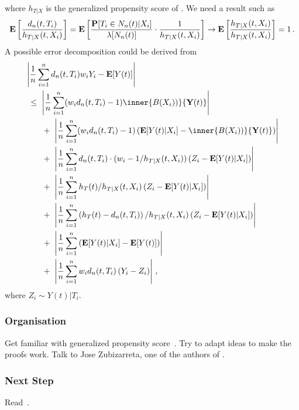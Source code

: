 where 
$
        h_{T|X}
        $ is the generalized propensity score of \cite{Hirano2005}. 
        We need a result such as
  \begin{align*}
    \mathbf{E}
    \left[ 
      \frac{
        d_n(t,T_i)
      }{
        h_{T|X}(t,X_i)
      }
    \right]
    =
    \mathbf{E}
    \left[ 
      \frac{
        \mathbf{P}
        [ T_i \in N_n(t) | X_i]
      }
      {
        \mathbf{\lambda}[N_n(t)]
      }
      \cdot
      \frac{1}
      {
        h_{T|X}(t,X_i)
      }
    \right]
    \to
    \mathbf{E}
    \left[ 
      \frac
      {
        h_{T|X}(t,X_i)
      }
      {
        h_{T|X}(t,X_i)
      }
    \right]
    =1
    \,.
  \end{align*}
  A possible error decomposition could be derived from
\begin{align*}
  &\left| 
  \frac{1}{n}
  \sum_{i=1}^{n} 
  d_n(t,T_i)
  w_i
  Y_i
  -
  \E[Y(t)]
  \right|
  \\
  &
  \ 
  \le
  \ 
  \left|  
  \frac{1}{n}
    \sum_{i=1}^{n} 
    (
    w_i 
  d_n(t,T_i)
    -
    1
    )
    \inner
    {B(X_i))}
    { \mathbf{Y}(t) }
  \right|
  \\
  &
  \qquad
  +
  \ 
  \left|  
  \frac{1}{n}
    \sum_{i=1}^{n} 
    (
    w_i 
  d_n(t,T_i)
    -
    1
    )
    \left( 
    \E[Y(t)| X_i]
    -
    \inner
    {B(X_i))}
    { \mathbf{Y}(t) }
    \right)
  \right|
  \\
  &
  \qquad
  +
  \ 
  \left|  
  \frac{1}{n}
    \sum_{i=1}^{n} 
  d_n(t,T_i)
    \cdot
    (
    w_i 
    -
    1/
h_{T|X}(t,X_i)
    )
    \left( 
      Z_i
    -
    \E[Y(t)| X_i]
    \right)
  \right|
  \\
  &
  \qquad
  +
  \ 
  \left|  
  \frac{1}{n}
    \sum_{i=1}^{n} 
h_{T}(t)
    /
h_{T|X}(t,X_i)
    \left( 
      Z_i
    -
    \E[Y(t)| X_i]
    \right)
  \right|
  \\
  &
  \qquad
  +
  \ 
  \left|  
  \frac{1}{n}
    \sum_{i=1}^{n} 
    \left( 
h_{T}(t)
-
  d_n(t,T_i)
    \right)
    /
h_{T|X}(t,X_i)
    \left( 
      Z_i
    -
    \E[Y(t)| X_i]
    \right)
  \right|
  \\
  &
  \qquad
  +
  \ 
  \left|  
  \frac{1}{n}
    \sum_{i=1}^{n} 
    \left( 
    \E[Y(t)| X_i]
    -
    \E[Y(t)]
    \right)
  \right|
  \\
  &
  \qquad
  +
  \ 
  \left|  
  \frac{1}{n}
    \sum_{i=1}^{n} 
    w_i 
d_n(t,T_i)
    \left( 
      Y_i
    -
    Z_i
    \right)
  \right|
  \,,
\end{align*}
where $ Z_i \sim Y(t)|T_i $.

\subsubsection{Organisation}
Get familiar with generalized propensity score~\cite{Hirano2005}.
Try to adapt ideas to make the proofs work.
Talk to Jose Zubizarreta, one of the authors of \cite{Wang2019}. 
\subsubsection{Next Step}
Read~\cite{Hirano2005}.
